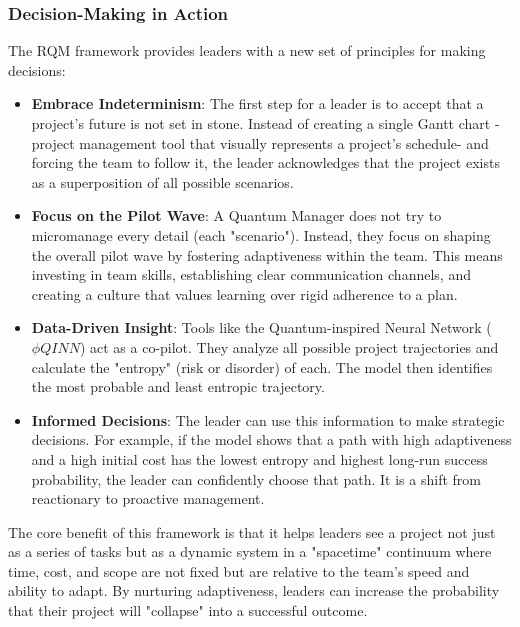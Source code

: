 \documentclass{article}
\begin{document}
\subsubsection*{Decision-Making in Action}
The RQM framework provides leaders with a new set of principles for making decisions:
\begin{itemize}
\item \textbf{Embrace Indeterminism}: The first step for a leader is to accept that a project's future is not set in stone. Instead of creating a single Gantt chart -project management tool that visually represents a project's schedule- and forcing the team to follow it, the leader acknowledges that the project exists as a superposition of all possible scenarios.
\item \textbf{Focus on the Pilot Wave}: A Quantum Manager does not try to micromanage every detail (each "scenario"). Instead, they focus on shaping the overall pilot wave by fostering adaptiveness within the team. This means investing in team skills, establishing clear communication channels, and creating a culture that values learning over rigid adherence to a plan.
\item \textbf{Data-Driven Insight}: Tools like the Quantum-inspired Neural Network ($\phi QINN$) act as a co-pilot. They analyze all possible project trajectories and calculate the "entropy" (risk or disorder) of each. The model then identifies the most probable and least entropic trajectory.
\item \textbf{Informed Decisions}: The leader can use this information to make strategic decisions. For example, if the model shows that a path with high adaptiveness and a high initial cost has the lowest entropy and highest long-run success probability, the leader can confidently choose that path. It is a shift from reactionary to proactive management.
\end{itemize}

The core benefit of this framework is that it helps leaders see a project not just as a series of tasks but as a dynamic system in a "spacetime" continuum where time, cost, and scope are not fixed but are relative to the team's speed and ability to adapt. By nurturing adaptiveness, leaders can increase the probability that their project will "collapse" into a successful outcome.
\end{document}
